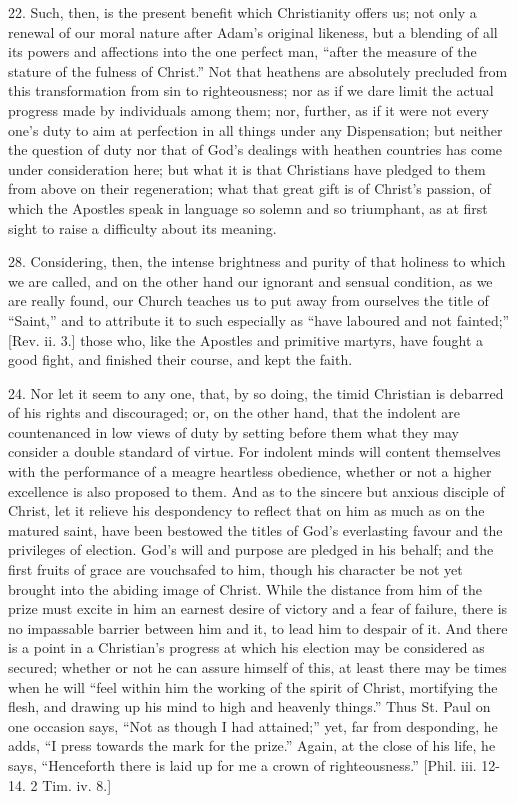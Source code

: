 22. Such, then, is the present benefit which Christianity offers
us; not only a renewal of our moral nature after Adam's original
likeness, but a blending of all its powers and affections into the one
perfect man, ``after the measure of the stature of the fulness of
Christ.'' Not that heathens are absolutely precluded from this
transformation from sin to righteousness; nor as if we dare limit the
actual progress made by individuals among them; nor, further, as if it
were not every one's duty to aim at perfection in all things under any
Dispensation; but neither the question of duty nor that of God's
dealings with heathen countries has come under consideration here; but
what it is that Christians have pledged to them from above on their
regeneration; what that great gift is of Christ's passion, of which
the Apostles speak in language so solemn and so triumphant, as at
first sight to raise a difficulty about its meaning.

28. Considering, then, the intense brightness and purity of that
holiness to which we are called, and on the other hand our ignorant
and sensual condition, as we are really found, our Church teaches us
to put away from ourselves the title of ``Saint,'' and to
attribute it to such especially as ``have laboured and not
fainted;'' [Rev. ii. 3.] those who, like the Apostles and
primitive martyrs, have fought a good fight, and finished their
course, and kept the faith.

24. Nor let it seem to any one, that, by so doing, the timid
Christian is debarred of his rights and discouraged; or, on the other
hand, that the indolent are countenanced in low views of duty by
setting before them what they may consider a double standard of
virtue. For indolent minds will content themselves with the
performance of a meagre heartless obedience, whether or not a higher
excellence is also proposed to them. And as to the sincere but anxious
disciple of Christ, let it relieve his despondency to reflect that on
him as much as on the matured saint, have been bestowed the titles of
God's everlasting favour and the privileges of election. God's will
and purpose are pledged in his behalf; and the first fruits of grace
are vouchsafed to him, though his character be not yet brought into
the abiding image of Christ. While the distance from him of the prize
must excite in him an earnest desire of victory and a fear of failure,
there is no impassable barrier between him and it, to lead him to
despair of it. And there is a point in a Christian's progress at which
his election may be considered as secured; whether or not he can
assure himself of this, at least there may be times when he will
``feel within him the working of the spirit of Christ, mortifying
the flesh, and drawing up his mind to high and heavenly things.''
Thus St. Paul on one occasion says, ``Not as though I had
attained;'' yet, far from desponding, he adds, ``I press
towards the mark for the prize.'' Again, at the close of his life,
he says, ``Henceforth there is laid up for me a crown of
righteousness.'' [Phil. iii. 12-14. 2 Tim. iv. 8.]

